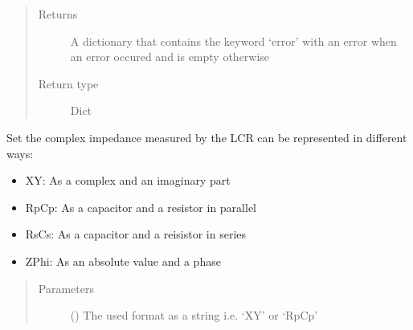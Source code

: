 \documentclass[letterpaper,10pt,english]{sphinxmanual}
\begin{document}
\begin{fulllineitems}
\begin{fulllineitems}
\begin{quote}
\begin{description}
\item[{Returns}] \leavevmode
\sphinxAtStartPar
A dictionary that contains the keyword ‘error’ with an error when an error occured and is empty otherwise

\item[{Return type}] \leavevmode
\sphinxAtStartPar
Dict

\end{description}\end{quote}

\end{fulllineitems}


\begin{fulllineitems}
\label{\detokenize{index:TiePieLCR_settings.TiePieLCR_settings.set_demodulation_params}}
\end{fulllineitems}


\begin{fulllineitems}
\label{\detokenize{index:TiePieLCR_settings.TiePieLCR_settings.set_impedance_format}}
\sphinxAtStartPar
Set the complex impedance measured by the LCR can be represented in different ways:
\begin{itemize}
\item {} 
\sphinxAtStartPar
XY: As a complex and an imaginary part

\item {} 
\sphinxAtStartPar
RpCp: As a capacitor and a resistor in parallel

\item {} 
\sphinxAtStartPar
RsCs: As a capacitor and a reisistor in series

\item {} 
\sphinxAtStartPar
ZPhi: As an absolute value and a phase

\end{itemize}
\begin{quote}\begin{description}
\item[{Parameters}] \leavevmode
\sphinxAtStartPar
{} () \textendash{} The used format as a string i.e. ‘XY’ or ‘RpCp’


\end{description}
\end{quote}
\end{fulllineitems}
\end{fulllineitems}
\end{document}

